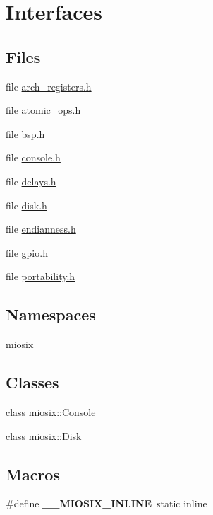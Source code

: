 \hypertarget{group___interfaces}{\section{Interfaces}
\label{group___interfaces}
}
\subsection*{Files}
\begin{DoxyCompactItemize}
\item 
file \hyperlink{arch__registers_8h}{arch\-\_\-registers.\-h}
\item 
file \hyperlink{atomic__ops_8h}{atomic\-\_\-ops.\-h}
\item 
file \hyperlink{bsp_8h}{bsp.\-h}
\item 
file \hyperlink{console_8h}{console.\-h}
\item 
file \hyperlink{delays_8h}{delays.\-h}
\item 
file \hyperlink{disk_8h}{disk.\-h}
\item 
file \hyperlink{endianness_8h}{endianness.\-h}
\item 
file \hyperlink{gpio_8h}{gpio.\-h}
\item 
file \hyperlink{portability_8h}{portability.\-h}
\end{DoxyCompactItemize}
\subsection*{Namespaces}
\begin{DoxyCompactItemize}
\item 
\hyperlink{namespacemiosix}{miosix}
\end{DoxyCompactItemize}
\subsection*{Classes}
\begin{DoxyCompactItemize}
\item 
class \hyperlink{classmiosix_1_1_console}{miosix\-::\-Console}
\item 
class \hyperlink{classmiosix_1_1_disk}{miosix\-::\-Disk}
\end{DoxyCompactItemize}
\subsection*{Macros}
\begin{DoxyCompactItemize}
\item 
\hypertarget{group___interfaces_gad6ceb45da12db3d07d6b0c47e0181cff}{\#define {\bfseries \-\_\-\-\_\-\-M\-I\-O\-S\-I\-X\-\_\-\-I\-N\-L\-I\-N\-E}~static inline}\label{group___interfaces_gad6ceb45da12db3d07d6b0c47e0181cff}

\end{DoxyCompactItemize}
